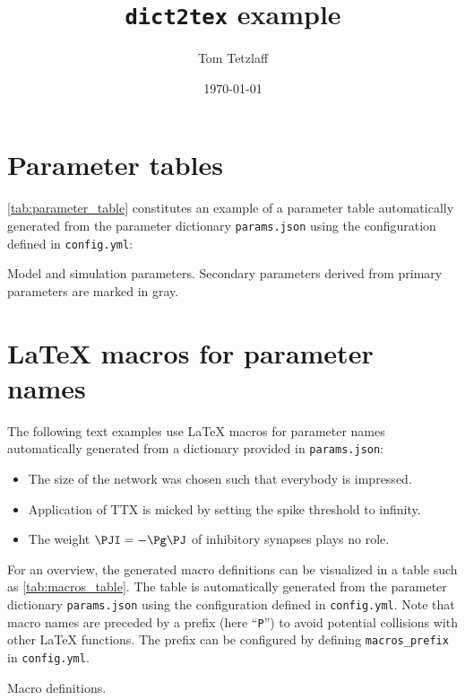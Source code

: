 \documentclass[10pt,a4paper,american]{article}
\begin{document}
\title{\texttt{dict2tex} example}
\author{Tom Tetzlaff}
\date{\today}

\maketitle
\tableofcontents

\section{Parameter tables}

\cref{tab:parameter_table} constitutes an example of a parameter table automatically generated from the parameter dictionary \texttt{params.json} using the configuration defined in \texttt{config.yml}: 
\begin{table}[ht!]
\begin{center}
  \parbox{0.8\linewidth}{       %
    \small%
    \centering%
    \renewcommand{\arraystretch}{1.5}%
    \noindent%
    \caption{Model and simulation parameters. Secondary parameters derived from primary parameters are marked in gray.}
    \label{tab:parameter_table}
  }
\end{center}
\end{table}

\section{LaTeX macros for parameter names}


The following text examples use LaTeX macros for parameter names automatically generated from a dictionary provided in \texttt{params.json}:
\begin{itemize}
\item The size \PN of the network was chosen such that everybody is impressed.
\item Application of TTX is micked by setting the spike threshold \PVth to infinity.
\item The weight $\PJI=-\Pg\PJ$ of inhibitory synapses plays no role.
\end{itemize}
For an overview, the generated macro definitions can be visualized in a table such as \cref{tab:macros_table}. The table is automatically generated from the parameter dictionary \texttt{params.json} using the configuration defined in \texttt{config.yml}. Note that macro names are preceded by a prefix (here ``\verb+P+'') to avoid potential collisions with other LaTeX functions. The prefix can be configured by defining \verb+macros_prefix+ in \texttt{config.yml}.
\begin{table}[ht!]
\begin{center}
  \parbox{0.8\linewidth}{       %
    \small%
    \centering%
    \renewcommand{\arraystretch}{1.5}%
    \noindent%
    \caption{Macro definitions.}
    \label{tab:macros_table}
  }
\end{center}
\end{table}
\end{document}

